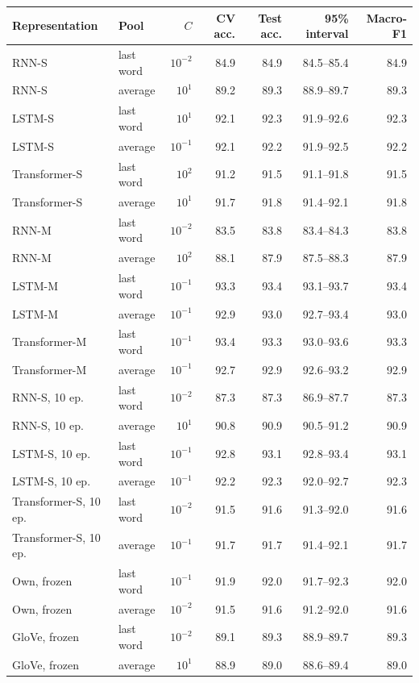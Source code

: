 \begin{tabular}{@{}llrrrrr@{}}
\toprule
Representation & Pool & $C$ & CV acc. & Test acc. & 95\% interval & Macro-F1 \\
\midrule
RNN-S & last word & $10^{-2}$ & 84.9 & 84.9 & 84.5--85.4 & 84.9 \\
RNN-S & average & $10^{1}$ & 89.2 & 89.3 & 88.9--89.7 & 89.3 \\
LSTM-S & last word & $10^{1}$ & 92.1 & 92.3 & 91.9--92.6 & 92.3 \\
LSTM-S & average & $10^{-1}$ & 92.1 & 92.2 & 91.9--92.5 & 92.2 \\
Transformer-S & last word & $10^{2}$ & 91.2 & 91.5 & 91.1--91.8 & 91.5 \\
Transformer-S & average & $10^{1}$ & 91.7 & 91.8 & 91.4--92.1 & 91.8 \\
RNN-M & last word & $10^{-2}$ & 83.5 & 83.8 & 83.4--84.3 & 83.8 \\
RNN-M & average & $10^{2}$ & 88.1 & 87.9 & 87.5--88.3 & 87.9 \\
LSTM-M & last word & $10^{-1}$ & 93.3 & 93.4 & 93.1--93.7 & 93.4 \\
LSTM-M & average & $10^{-1}$ & 92.9 & 93.0 & 92.7--93.4 & 93.0 \\
Transformer-M & last word & $10^{-1}$ & 93.4 & 93.3 & 93.0--93.6 & 93.3 \\
Transformer-M & average & $10^{-1}$ & 92.7 & 92.9 & 92.6--93.2 & 92.9 \\
RNN-S, 10 ep. & last word & $10^{-2}$ & 87.3 & 87.3 & 86.9--87.7 & 87.3 \\
RNN-S, 10 ep. & average & $10^{1}$ & 90.8 & 90.9 & 90.5--91.2 & 90.9 \\
LSTM-S, 10 ep. & last word & $10^{-1}$ & 92.8 & 93.1 & 92.8--93.4 & 93.1 \\
LSTM-S, 10 ep. & average & $10^{-1}$ & 92.2 & 92.3 & 92.0--92.7 & 92.3 \\
Transformer-S, 10 ep. & last word & $10^{-2}$ & 91.5 & 91.6 & 91.3--92.0 & 91.6 \\
Transformer-S, 10 ep. & average & $10^{-1}$ & 91.7 & 91.7 & 91.4--92.1 & 91.7 \\
Own, frozen & last word & $10^{-1}$ & 91.9 & 92.0 & 91.7--92.3 & 92.0 \\
Own, frozen & average & $10^{-2}$ & 91.5 & 91.6 & 91.2--92.0 & 91.6 \\
GloVe, frozen & last word & $10^{-2}$ & 89.1 & 89.3 & 88.9--89.7 & 89.3 \\
GloVe, frozen & average & $10^{1}$ & 88.9 & 89.0 & 88.6--89.4 & 89.0 \\

\end{tabular}
